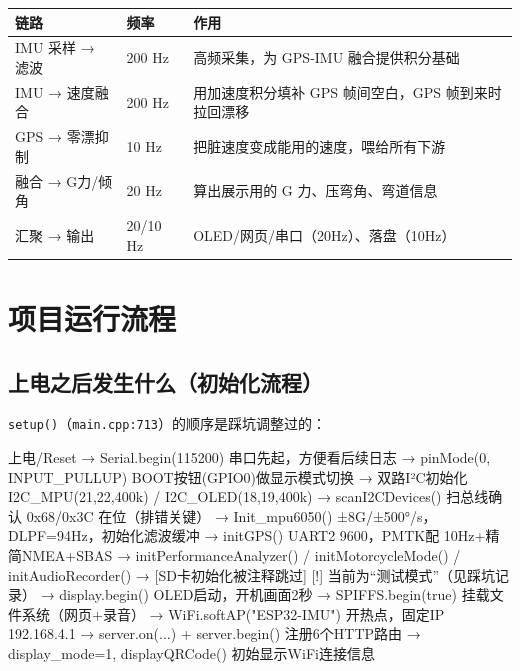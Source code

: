 \documentclass[UTF8,11pt,a4paper]{ctexart}
\begin{document}
\begin{center}\small
\begin{tabularx}{\linewidth}{@{}llX@{}}
\toprule
\textbf{链路} & \textbf{频率} & \textbf{作用} \\
\midrule
IMU 采样 → 滤波 & 200 Hz & 高频采集，为 GPS-IMU 融合提供积分基础 \\
IMU → 速度融合 & 200 Hz & 用加速度积分填补 GPS 帧间空白，GPS 帧到来时拉回漂移 \\
GPS → 零漂抑制 & 10 Hz & 把脏速度变成能用的速度，喂给所有下游 \\
融合 → G力/倾角 & 20 Hz & 算出展示用的 G 力、压弯角、弯道信息 \\
汇聚 → 输出 & 20/10 Hz & OLED/网页/串口（20Hz）、落盘（10Hz） \\
\bottomrule
\end{tabularx}
\end{center}

\section{项目运行流程}

\subsection{上电之后发生什么（初始化流程）}
\texttt{setup()}（\texttt{main.cpp:713}）的顺序是踩坑调整过的：
\begin{ascii}
上电/Reset
  → Serial.begin(115200)          串口先起，方便看后续日志
  → pinMode(0, INPUT_PULLUP)      BOOT按钮(GPIO0)做显示模式切换
  → 双路I²C初始化  I2C_MPU(21,22,400k) / I2C_OLED(18,19,400k)
  → scanI2CDevices()              扫总线确认 0x68/0x3C 在位（排错关键）
  → Init_mpu6050()                ±8G/±500°/s，DLPF=94Hz，初始化滤波缓冲
  → initGPS()                     UART2 9600，PMTK配 10Hz+精简NMEA+SBAS
  → initPerformanceAnalyzer() / initMotorcycleMode() / initAudioRecorder()
  → [SD卡初始化被注释跳过]          [!] 当前为“测试模式”（见踩坑记录）
  → display.begin()               OLED启动，开机画面2秒
  → SPIFFS.begin(true)            挂载文件系统（网页+录音）
  → WiFi.softAP("ESP32-IMU")      开热点，固定IP 192.168.4.1
  → server.on(...) + server.begin()   注册6个HTTP路由
  → display_mode=1, displayQRCode()   初始显示WiFi连接信息
\end{ascii}
\end{document}
